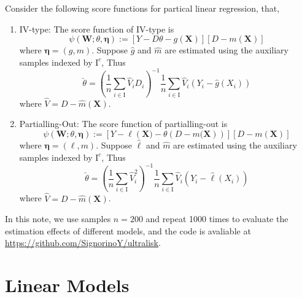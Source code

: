 \documentclass[en,12pt,mtpro2]{elegantpaper}
\begin{document}
Consider the following score functions for partical linear regression, that,
\begin{enumerate}
    \item IV-type: The score function of IV-type is
          \begin{equation}
              \psi\left(\mathbf{W};\theta,\boldsymbol{\eta}\right):=\left[Y-D\theta-g(\mathbf{X})\right]\left[D-m(\mathbf{X})\right]
          \end{equation}
          where $\boldsymbol{\eta}=(g,m)$. Suppose $\hat{g}$ and $\hat{m}$ are estimated using the auxiliary samples indexed by $\mathrm{I}^{c}$, Thus
          \begin{equation}
              \check{\theta}=\left(\frac{1}{n}\sum_{i\in\mathrm{I}}\widehat{V}_{i}D_{i}\right)^{-1}\frac{1}{n}\sum_{i\in\mathrm{I}}\hat{V}_{i}\left(Y_{i}-\hat{g}\left(X_{i}\right)\right)
          \end{equation}
          where $\hat{V}=D-\hat{m}(\mathbf{X})$.
    \item Partialling-Out: The score function of partialling-out is
          \begin{equation}
              \psi\left(\mathbf{W};\theta,\boldsymbol{\eta}\right):=\left[Y-\ell\left(\mathbf{X})-\theta\left(D-m(\mathbf{X}\right)\right)\right]\left[D-m(\mathbf{X})\right]
          \end{equation}
          where $\boldsymbol{\eta}=(\ell,m)$. Suppose $\hat{\ell}$ and $\hat{m}$ are estimated using the auxiliary samples indexed by $\mathrm{I}^{c}$, Thus
          \begin{equation}
              \check{\theta}=\left(\frac{1}{n}\sum_{i\in\mathrm{I}}\widehat{V}_{i}^{2}\right)^{-1}\frac{1}{n}\sum_{i\in\mathrm{I}}\hat{V}_{i}\left(Y_{i}-\hat{\ell}\left(X_{i}\right)\right)
          \end{equation}
          where $\hat{V}=D-\hat{m}(\mathbf{X})$.
\end{enumerate}

In this note, we use samples $n=200$ and repeat 1000 times to evaluate the estimation effects of different models, and the code is avaliable at \href{https://github.com/SignorinoY/ultralisk}{https://github.com/SignorinoY/ultralisk}.
\clearpage

\section{Linear Models}
\end{document}
